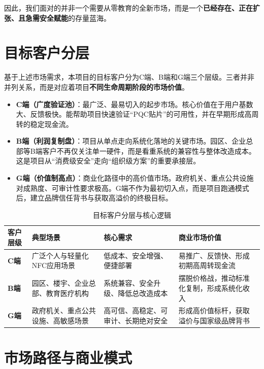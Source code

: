 因此，我们面对的并非一个需要从零教育的全新市场，而是一个\textbf{已经存在、正在扩张、且急需安全赋能}的存量蓝海。

\section{目标客户分层}

基于上述市场需求，本项目的目标客户分为C端、B端和G端三个层级。三者并非并列关系，而是对应着项目\textbf{不同生命周期阶段的市场价值}。

\begin{itemize}
	\item \textbf{C端（广度验证池）}：最广泛、最易切入的起步市场。核心价值在于用户基数大、反馈极快。能帮助项目快速验证“PQC贴片”的可用性，并在早期形成高周转的稳定现金流。
	\item \textbf{B端（利润复制盘）}：项目从单点走向系统化落地的关键市场。园区、企业总部等B端客户不再仅关注单一硬件，而是看重系统的兼容性与整体改造成本。这是项目从“消费级安全”走向“组织级方案”的重要承接层。
	\item \textbf{G端（价值制高点）}：商业化路径中的高价值市场。政府机关、重点公共设施对成熟度、可审计性要求极高。G端不作为最初切入点，而是项目跑通模式后，建立品牌信任背书与获取高溢价的终极目标。
\end{itemize}

\begin{table}[htbp]
	\centering
	\caption{目标客户分层与核心逻辑}
	\label{tab:customer_segments}
	\renewcommand{\arraystretch}{1.4}
	\begin{tabular}{p{1.5cm}p{3.5cm}p{4cm}p{4.5cm}}
		\toprule
		\textbf{客户层级} & \textbf{典型场景} & \textbf{核心需求} & \textbf{商业市场价值} \\
		\midrule
		\textbf{C端} & 广泛个人与轻量化NFC应用场景 & 低成本、安全增强、便捷部署 & 易推广、反馈快、形成初期高周转现金流 \\
		\midrule
		\textbf{B端} & 园区、楼宇、企业总部、教育医疗机构 & 系统兼容、安全升级、降低总改造成本 & 摆脱价格战，推动标准化复制，形成系统化收入 \\
		\midrule
		\textbf{G端} & 政府机关、重点公共设施、高敏感场景 & 高可信、高稳定、可审计、长期绝对安全 & 形成高价值标杆，获取溢价与国家级品牌背书 \\
		\bottomrule
	\end{tabular}
\end{table}

\section{市场路径与商业模式}

